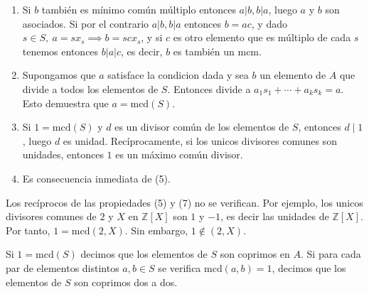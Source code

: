 \begin{proofbox}
\begin{enumerate}
\item Si $b$ también es mínimo común múltiplo entonces $a | b, b | a$, luego $a$ y $b$ son asociados. Si por el contrario $a | b, b | a$ entonces $b = ac$, y dado $s \in S,\ a = sx_s \implies b = scx_s$, y si $c$ es otro elemento que es múltiplo de cada $s$ tenemos entonces $b | a | c$, es decir, $b$ es también un $\text{mcm}$.

\item Supongamos que \(a\) satisface la condicion dada y sea \(b\) un elemento de \(A\) que divide a todos los elementos de \(S\). Entonces divide a \(a_1 s_1 + \cdots + a_k s_k = a\). Esto demuestra que \(a = \mathrm{mcd}(S)\).

\item Si \(1 = \mathrm{mcd}(S)\) y \(d\) es un divisor común de los elementos de \(S\), entonces \(d \mid 1\), luego \(d\) es unidad. Recíprocamente, si los unicos divisores comunes son unidades, entonces \(1\) es un máximo común divisor.

\item Es consecuencia inmediata de (5).
\end{enumerate}

\end{proofbox}

\begin{example}{}{}
Los recíprocos de las propiedades (5) y (7) no se verifican. Por ejemplo, los unicos divisores comunes de \(2\) y \(X\) en \(\mathbb{Z}[X]\) son \(1\) y \(-1\), es decir las unidades de \(\mathbb{Z}[X]\). Por tanto, \(1 = \mathrm{mcd}(2,X)\). Sin embargo, \(1 \not\in (2,X)\).
\end{example}

Si \(1 = \mathrm{mcd}(S)\) decimos que los elementos de \(S\) son coprimos en \(A\). Si para cada par de elementos distintos \(a, b \in S\) se verifica \(\mathrm{mcd}(a,b) = 1\), decimos que los elementos de \(S\) son coprimos dos a dos.